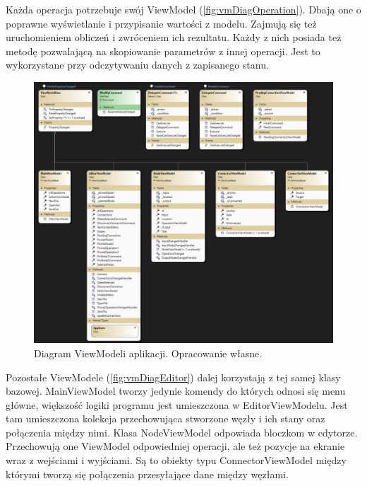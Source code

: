 Każda operacja potrzebuje swój ViewModel (\autoref{fig:vmDiagOperation}). Dbają one o poprawne wyświetlanie i przypisanie wartości z modelu. Zajmują się też uruchomieniem obliczeń i zwróceniem ich rezultatu. Każdy z nich posiada też metodę pozwalającą na skopiowanie parametrów z innej operacji. Jest to wykorzystane przy odczytywaniu danych z zapisanego stanu.

\begin{figure}[H]
    \centering
    \includegraphics[width=1\linewidth]{images/Picture21.jpg}
    \caption{Diagram ViewModeli aplikacji. Opracowanie własne.}
    \label{fig:vmDiagEditor}
\end{figure}

Pozostałe ViewModele (\autoref{fig:vmDiagEditor}) dalej korzystają z tej samej klasy bazowej.
MainViewModel tworzy jedynie komendy do których odnosi się menu główne, większość logiki programu jest umieszczona w EditorViewModelu.
Jest tam umieszczona kolekcja przechowująca stworzone węzły i ich stany oraz połączenia między nimi.
Klasa NodeViewModel odpowiada bloczkom w edytorze. Przechowują one ViewModel odpowiedniej operacji, ale też pozycje na ekranie wraz z wejściami i wyjściami. 
Są to obiekty typu ConnectorViewModel między którymi tworzą się połączenia przesyłające dane między węzłami. 
